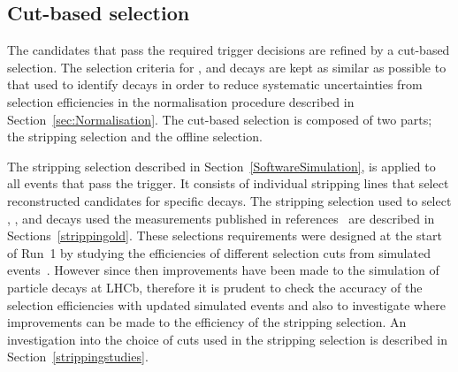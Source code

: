 
\subsection{Cut-based selection}
\label{sec:cutbasedsel}
The \bmumu candidates that pass the required trigger decisions are refined by a cut-based selection. %
The selection criteria for \bhh, \bujpsik and \bsjpsiphi decays are kept as similar as possible to that used to identify \bmumu decays in order to reduce systematic uncertainties from selection efficiencies in the normalisation procedure described in Section~\ref{sec:Normalisation}. 
The cut-based selection is composed of two parts; the stripping selection and the offline selection. 

The stripping selection described in Section~\ref{SoftwareSimulation}, is applied to all events that pass the trigger. It consists of individual stripping lines that select reconstructed candidates for specific decays. The stripping selection used to select \bmumu, \bhh, \bujpsik and \bsjpsiphi decays used the \BF measurements published in references~\cite{Aaij:2013aka,CMS:2014xfa} are described in Sections~\ref{strippingold}.
These selections requirements were designed at the start of Run~1 by studying the efficiencies of different selection cuts from simulated events~\cite{Diego}. However since then improvements have been made to the simulation of particle decays at LHCb, therefore it is prudent to check the accuracy of the selection efficiencies with updated simulated events and also to investigate where improvements can be made to the efficiency of the \bmumu stripping selection. %
An investigation into the choice of cuts used in the stripping selection is described in Section~\ref{strippingstudies}. 

